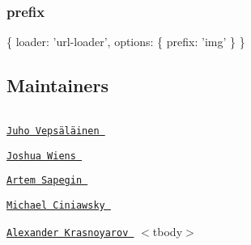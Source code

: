 \subsubsection*{{\ttfamily prefix}}


\begin{DoxyCode}
\{
  loader: 'url-loader',
  options: \{
    prefix: 'img'
  \}
\}
\end{DoxyCode}


\subsection*{Maintainers}

\tabulinesep=1mm
\begin{longtabu} spread 0pt [c]{*{0}{|X[-1]}|}
\hline
\end{longtabu}


\href{https://github.com/bebraw}{\tt Juho Vepsäläinen }  

\href{https://github.com/d3viant0ne}{\tt Joshua Wiens }  

\href{https://github.com/sapegin}{\tt Artem Sapegin }  

\href{https://github.com/michael-ciniawsky}{\tt Michael Ciniawsky }  

\href{https://github.com/evilebottnawi}{\tt Alexander Krasnoyarov }   $<$tbody$>$ 